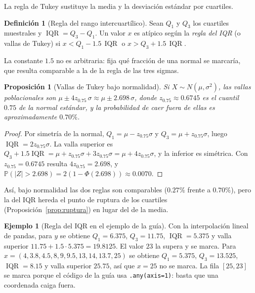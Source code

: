 \documentclass[11pt]{article}
\newtheorem{proposicion}[teorema]{Proposición}
\theoremstyle{definition}
\newtheorem{definicion}[teorema]{Definición}
\newtheorem{ejemplo}[teorema]{Ejemplo}
\theoremstyle{remark}
\newcommand{\Prob}{\mathbb{P}}
\DeclareMathOperator{\IQR}{IQR}
\newcommand{\abs}[1]{\left\lvert #1\right\rvert}
\begin{document}
\noindent La regla de Tukey sustituye la media y la desviación estándar por cuartiles.

\begin{definicion}[Regla del rango intercuartílico]\label{def:iqr}
\noindent Sean $Q_1$ y $Q_3$ los cuartiles muestrales y $\IQR=Q_3-Q_1$. Un valor $x$ es atípico según la \emph{regla del IQR} (o vallas de Tukey) si $x<Q_1-1.5\,\IQR$ o $x>Q_3+1.5\,\IQR$.
\end{definicion}

\noindent La constante $1.5$ no es arbitraria: fija qué fracción de una normal se marcaría, que resulta comparable a la de la regla de las tres sigmas.

\begin{proposicion}[Vallas de Tukey bajo normalidad]\label{prop:tukey-normal}
\noindent Si $X\sim N(\mu,\sigma^2)$, las vallas poblacionales son $\mu\pm 4z_{0.75}\,\sigma\approx\mu\pm2.698\,\sigma$, donde $z_{0.75}\approx0.6745$ es el cuantil $0.75$ de la normal estándar, y la probabilidad de caer fuera de ellas es aproximadamente $0.70\%$.
\end{proposicion}
\begin{proof}
\noindent Por simetría de la normal, $Q_1=\mu-z_{0.75}\sigma$ y $Q_3=\mu+z_{0.75}\sigma$, luego $\IQR=2z_{0.75}\sigma$. La valla superior es $Q_3+1.5\IQR=\mu+z_{0.75}\sigma+3z_{0.75}\sigma=\mu+4z_{0.75}\sigma$, y la inferior es simétrica. Con $z_{0.75}=0.6745$ resulta $4z_{0.75}=2.698$, y $\Prob(\abs{Z}>2.698)=2(1-\Phi(2.698))\approx0.0070$.
\end{proof}

\noindent Así, bajo normalidad las dos reglas son comparables ($0.27\%$ frente a $0.70\%$), pero la del IQR hereda el punto de ruptura de los cuartiles (Proposición~\ref{prop:ruptura}) en lugar del de la media.

\begin{ejemplo}[Regla del IQR en el ejemplo de la guía]\label{ej:iqr}
\noindent Con la interpolación lineal de pandas, para $y$ se obtiene $Q_1=6.375$, $Q_3=11.75$, $\IQR=5.375$ y valla superior $11.75+1.5\cdot5.375=19.8125$. El valor $23$ la supera y se marca. Para $x=(4,3.8,4.5,8,9,9.5,13,14,13.7,25)$ se obtiene $Q_1=5.375$, $Q_3=13.525$, $\IQR=8.15$ y valla superior $25.75$, así que $x=25$ no se marca. La fila $[25,23]$ se marca porque el código de la guía usa \texttt{.any(axis=1)}: basta que una coordenada caiga fuera.
\end{ejemplo}
\end{document}
